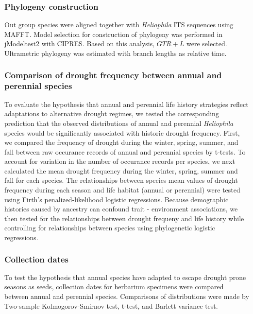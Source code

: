 \documentclass[man,floatsintext]{apa6}
\theoremstyle{definition}
\theoremstyle{definition}
\theoremstyle{definition}
\theoremstyle{remark}
\begin{document}
\hypertarget{phylogeny-construction}{%
\subsubsection{Phylogeny construction}\label{phylogeny-construction}}

Out group species were aligned together with \emph{Heliophila} ITS
sequences using MAFFT. Model selection for construction of phylogeny was
performed in jModeltest2 with CIPRES. Based on this analysis,
\(GTR + L\) were selected. Ultrametric phylogeny was estimated with
branch lengths as relative time.

\hypertarget{comparison-of-drought-frequency-between-annual-and-perennial-species}{%
\subsubsection{Comparison of drought frequency between annual and
perennial
species}\label{comparison-of-drought-frequency-between-annual-and-perennial-species}}

To evaluate the hypothesis that annual and perennial life history
strategies reflect adaptations to alternative drought regimes, we tested
the corresponding prediction that the observed distributions of annual
and perennial \emph{Heliophila} species would be significantly
associated with historic drought frequency. First, we compared the
frequency of drought during the winter, spring, summer, and fall between
raw occurance records of annual and perennial species by t-tests. To
account for variation in the number of occurance records per species, we
next calculated the mean drought frequency during the winter, spring,
summer and fall for each species. The relationships between species mean
values of drought frequency during each season and life habitat (annual
or perennial) were tested using Firth's penalized-likelihood logistic
regressions. Because demographic histories caused by ancestry can
confound trait - environment associations, we then tested for the
relationships between drought frequeny and life history while
controlling for relationships between species using phylogenetic
logistic regressions.

\hypertarget{collection-dates}{%
\subsubsection{Collection dates}\label{collection-dates}}

To test the hypothesis that annual species have adapted to escape
drought prone seasons as seeds, collection dates for herbarium specimens
were compared between annual and perennial species. Comparisons of
distributions were made by Two-sample Kolmogorov-Smirnov test, t-test,
and Barlett variance test.
\end{document}
